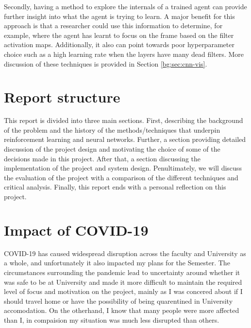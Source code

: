 Secondly, having a method to explore the internals of a trained agent can provide further insight into what the agent is trying to learn. A major benefit for this approach is that a researcher could use this information to determine, for example, where the agent has learnt to focus on the frame based on the filter activation maps. Additionally, it also can point towards poor hyperparameter choice such as a high learning rate when the layers have many dead filters. More discussion of these techniques is provided in Section \ref{bg:sec:cnn-vis}.

\section{Report structure}
\label{intro:sec:report_struc}

This report is divided into three main sections. First, describing the background of the problem and the history of the methods/techniques that underpin reinforcement learning and neural networks. Further, a section providing detailed discussion of the project design and motivating the choice of some of the decisions made in this project. After that, a section discussing the implementation of the project and system design. Penultimately, we will discuss the evaluation of the project with a comparison of the different techniques and critical analysis. Finally, this report ends with a personal reflection on this project.

\section{Impact of COVID-19}
COVID-19 has caused widespread disruption across the faculty and University as a whole, and unfortunately it also impacted my plans for the Semester. The circumstances surrounding the pandemic lead to uncertainty around whether it was safe to be at University and made it more difficult to maintain the required level of focus and motivation on the project, mainly as I was concered about if I should travel home or have the possibility of being quarentined in University accomodation. On the otherhand, I know that many people were more affected than I, in compaision my situation was much less disrupted than others.